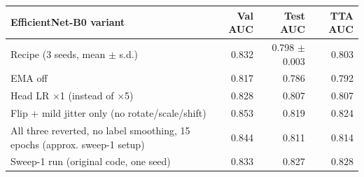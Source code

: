 \begin{tabular}{lrrr}
\toprule
EfficientNet-B0 variant & Val AUC & Test AUC & TTA AUC \\
\midrule
Recipe (3 seeds, mean $\pm$ s.d.) & 0.832 & 0.798 $\pm$ 0.003 & 0.803 \\
\midrule
EMA off & 0.817 & 0.786 & 0.792 \\
Head LR $\times$1 (instead of $\times$5) & 0.828 & 0.807 & 0.807 \\
Flip + mild jitter only (no rotate/scale/shift) & 0.853 & 0.819 & 0.824 \\
All three reverted, no label smoothing, 15 epochs (approx. sweep-1 setup) & 0.844 & 0.811 & 0.814 \\
Sweep-1 run (original code, one seed) & 0.833 & 0.827 & 0.828 \\
\bottomrule
\end{tabular}
